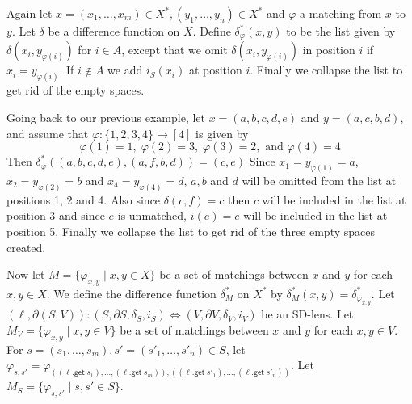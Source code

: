 \documentclass[acmsmall,review,anonymous]{acmart}\settopmatter{printfolios=true,printccs=false,printacmref=false}
\newcommand{\kw}[1]{\ensuremath{\mathsf{#1}}\xspace}
\newcommand{\get}{\ensuremath{\kw{get}}\xspace}
\begin{document}
Again let $x = (x_1, \ldots, x_m) \in X^*, (y_1, \ldots, y_n) \in X^*$ and
$\varphi$ a matching from $x$ to $y$. Let $\delta$ be a difference function on
$X$. Define $\delta^*_{\varphi}(x, y)$ to be the list given by $\delta(x_i,
y_{\varphi(i)})$ for $i \in A$, except that we omit $\delta(x_i,
y_{\varphi(i)})$ in position $i$ if $x_i = y_{\varphi(i)}$. If $i \not \in A$
we add $i_S(x_i)$ at position $i$. Finally we collapse the list to get rid of
the empty spaces. 

Going back to our previous example, let $x = (a, b, c, d, e)$ and $y = (a, c, b,
d)$, and assume that $\varphi : \{1, 2, 3, 4\} \longrightarrow [4]$ is
given by $$\varphi(1) = 1, \; \varphi(2) = 3, \; \varphi(3) = 2, \text{ and }
\varphi(4) = 4$$ Then $\delta_{\varphi}^*((a, b, c, d, e), (a, f, b, d)) = (c,
e)$ Since $x_1 = y_{\varphi(1)} = a$, $x_2 = y_{\varphi(2)} = b$ and $x_{4} =
y_{\varphi(4)} = d$, $a, b$ and $d$ will be omitted from the list at
positions 1, 2 and 4. Also since $\delta(c, f) = c$ then $c$ will be included in
the list at position 3 and since $e$ is unmatched, $i(e) = e$ will be
included in the list at position 5. Finally we collapse the list to get rid of
the three empty spaces created.

Now let $M = \{\varphi_{x, y} \; | \; x, y \in X\}$ be a set of matchings
between $x$ and $y$ for each $x, y \in X$. We define the difference function
$\delta^*_M$ on $X^*$ by $\delta^*_{M}(x, y) = \delta^*_{\varphi_{x, y}}$. Let
$(\ell, \partial (S, V)) : (S, \partial S, \delta_{S}, i_{S}) \Leftrightarrow
(V, \partial V, \delta_{V}, i_{V})$ be an SD-lens. Let $M_V = \{\varphi_{x, y}
\; | \; x, y \in V\}$ be a set of matchings between $x$ and $y$ for each $x, y
\in V$. For $s = (s_1, \ldots, s_m), s' = (s'_1, \ldots, s'_n) \in S$, let
$\varphi_{s, s'} = \varphi_{((\ell.\get \; s_1), \ldots, (\ell.\get \; s_m)),
((\ell.\get \; s'_1), \ldots, (\ell.\get \; s'_n))}$. Let $M_S = \{\varphi_{s,
s'} \; | \; s, s' \in S\}$. 
\end{document}
